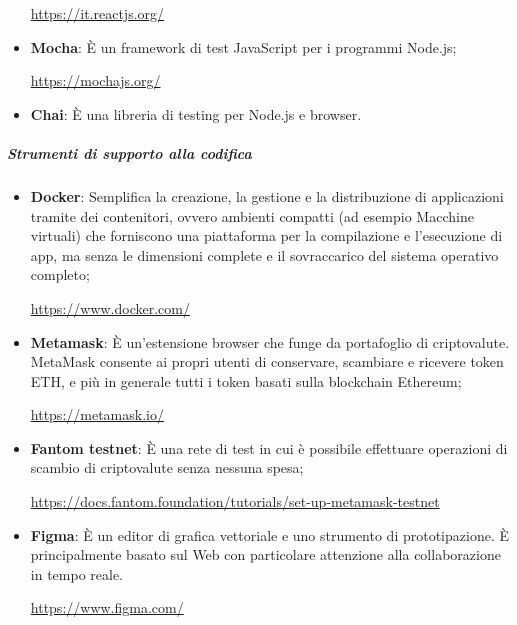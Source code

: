 \begin{itemize}
          \begin{center}\url{https://it.reactjs.org/}\end{center}
    \item \textbf{Mocha}: È un framework di test JavaScript per i programmi Node.js;
          \begin{center}\url{https://mochajs.org/}\end{center}
    \item \textbf{Chai}: È una libreria di testing per Node.js e browser.
          \begin{center}\url{}\end{center}
\end{itemize}
\subparagraph{Strumenti di supporto alla codifica}
\begin{itemize}
    \item \textbf{Docker}: Semplifica la creazione, la gestione e la distribuzione di applicazioni tramite dei contenitori, ovvero ambienti compatti (ad esempio Macchine virtuali) che forniscono una piattaforma per la compilazione e l'esecuzione di app, ma senza le dimensioni complete e il sovraccarico del sistema operativo completo;
          \begin{center}\url{https://www.docker.com/}\end{center}
    \item \textbf{Metamask}: È un'estensione browser che funge da portafoglio di criptovalute\glo{}. MetaMask consente ai propri utenti di conservare, scambiare e ricevere token\glo{} ETH, e più in generale tutti i token\glo{} basati sulla blockchain\glo{} Ethereum\glo{};
          \begin{center}\url{https://metamask.io/}\end{center}
    \item \textbf{Fantom testnet}: È una rete di test in cui è possibile effettuare operazioni di scambio di criptovalute\glo{} senza nessuna spesa;
          \begin{center}\url{https://docs.fantom.foundation/tutorials/set-up-metamask-testnet}\end{center}
    \item \textbf{Figma}: È un editor di grafica vettoriale e uno strumento di prototipazione. È principalmente basato sul Web con particolare attenzione alla collaborazione in tempo reale.
          \begin{center}\url{https://www.figma.com/}\end{center}
\end{itemize}